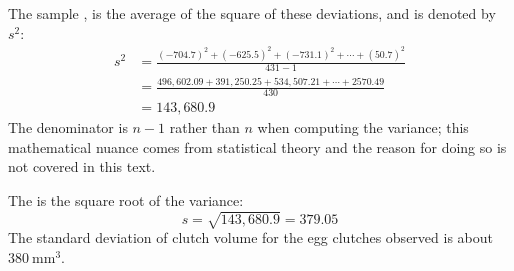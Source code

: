 The sample \label{varianceFirstDiscussed}, is the average of the square of these deviations, and is  denoted by $s^2$:
\begin{align*}
s^2 &= \frac{(-704.7)^2 + (-625.5)^2 + (-731.1)^2 + \cdots + (50.7)^2}{431-1} \\
&= \frac{496,602.09 + 391,250.25 + 534,507.21 + \cdots + 2570.49}{430} \\
&= 143,680.9
\end{align*}
The denominator is $n-1$ rather than $n$ when computing the variance; this mathematical nuance comes from statistical theory and the reason for doing so is not covered in this text.

The  is the square root of the variance:
$$s=\sqrt{143,680.9} = 379.05$$
 The standard deviation of clutch volume for the egg clutches observed is about $380\ \textrm{mm}^{3}$. 

